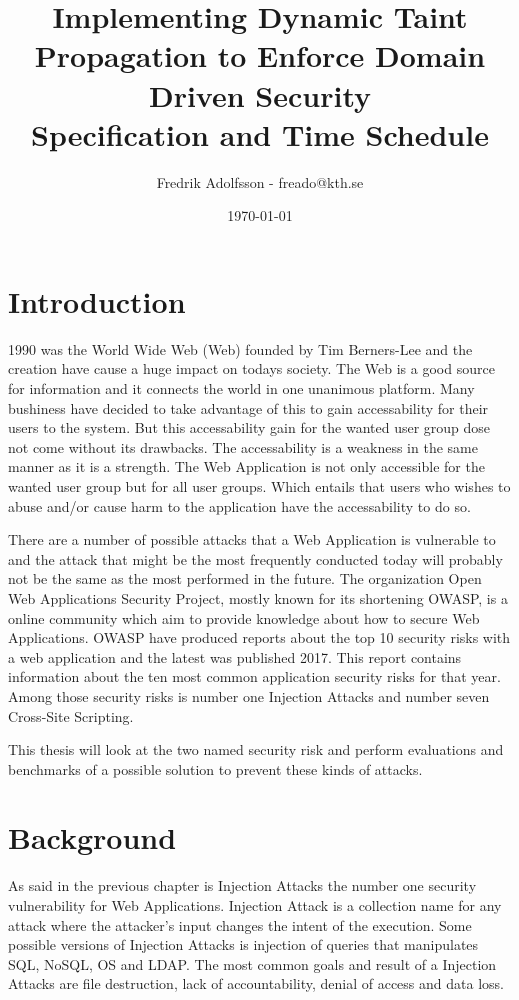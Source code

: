 \documentclass{../kththesis}
\title{Implementing Dynamic Taint Propagation to Enforce Domain Driven Security \\
        \large Specification and Time Schedule}
\author{Fredrik Adolfsson - freado@kth.se}
\date{\today}
\begin{document}
\frontmatter


\titlepage


\tableofcontents


\mainmatter



\chapter{Introduction}
1990 was the World Wide Web (Web) founded by Tim Berners-Lee and the creation have cause a huge impact on todays society. \parencite{www} The Web is a good source for information and it connects the world in one unanimous platform. Many bushiness have decided to take advantage of this to gain accessability for their users to the system. But this accessability gain for the wanted user group dose not come without its drawbacks. The accessability is a weakness in the same manner as it is a strength. The Web Application is not only accessible for the wanted user group but for all user groups. Which entails that users who wishes to abuse and/or cause harm to the application have the accessability to do so. 

There are a number of possible attacks that a Web Application is vulnerable to and the attack that might be the most frequently conducted today will probably not be the same as the most performed in the future. The organization Open Web Applications Security Project, mostly known for its shortening OWASP, is a online community which aim to provide knowledge about how to secure Web Applications. \parencite{OpenWebApplicationSecurityProject} OWASP have produced reports about the top 10 security risks with a web application and the latest was published 2017. This report contains information about the ten most common application security risks for that year. Among those security risks is number one Injection Attacks and number seven Cross-Site Scripting. \parencite{OWASP2017, OpenWebApplicationSecurityProject, CrossMichael2007Dgtw}

This thesis will look at the two named security risk and perform evaluations and benchmarks of a possible solution to prevent these kinds of attacks. 



\chapter{Background}
As said in the previous chapter is Injection Attacks the number one security vulnerability for Web Applications. Injection Attack is a collection name for any attack where the attacker's input changes the intent of the execution. Some possible versions of Injection Attacks is injection of queries that manipulates SQL, NoSQL, OS and LDAP. \parencite{OWASP2017} The most common goals and result of a Injection Attacks are file destruction, lack of accountability, denial of access and data loss. \parencite{Secure_Web} 
\end{document}
